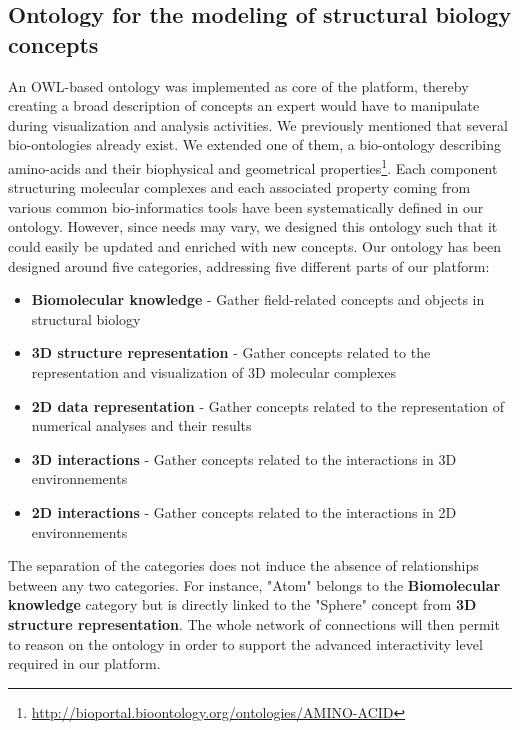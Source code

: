 \documentclass{vgtc}                          %
\begin{document}
\subsection{Ontology for the modeling of structural biology concepts}

An OWL-based ontology was implemented as core of the platform, thereby creating a broad description of concepts an expert would have to manipulate during visualization and analysis activities. We previously mentioned that several bio-ontologies already exist. We extended one of them, a bio-ontology describing amino-acids and their biophysical and geometrical properties\footnote{\url{http://bioportal.bioontology.org/ontologies/AMINO-ACID}}.
Each component structuring molecular complexes and each associated property coming from various common bio-informatics tools have been systematically defined in our ontology. However, since needs may vary, we designed this ontology such that it could easily be updated and enriched with new concepts.
Our ontology has been designed around five categories, addressing five different parts of our platform:

\begin{itemize}
  \item \textbf{Biomolecular knowledge} - Gather field-related concepts and objects in structural biology 
  \item \textbf{3D structure representation} - Gather concepts related to the representation and visualization of 3D molecular complexes
  \item \textbf{2D data representation} - Gather concepts related to the representation of numerical analyses and their results
  \item \textbf{3D interactions} - Gather concepts related to the interactions in 3D environnements
  \item \textbf{2D interactions} - Gather concepts related to the interactions in 2D environnements
\end{itemize}

The separation of the categories does not induce the absence of relationships between any two categories. For instance, "Atom" belongs to the \textbf{Biomolecular knowledge} category but is directly linked to the "Sphere" concept from \textbf{3D structure representation}. The whole network of connections will then permit to reason on the ontology in order to support the advanced interactivity level required in our platform.
\end{document}

